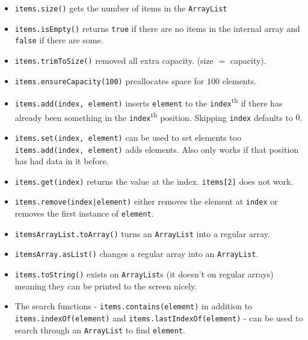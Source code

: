 \begin{itemize}
    \item \texttt{items.size()} gets the number of items in the \texttt{ArrayList}
    \item \texttt{items.isEmpty()} returns \texttt{true} if there are no items in the internal array and \texttt{false} if there are some.
    \item \texttt{items.trimToSize()} removed all extra capacity. (size \(=\) capacity).
    \item \texttt{items.ensureCapacity(100)} preallocates space for \(100\) elements.
    \item \texttt{items.add(index, element)} inserts \texttt{element} to the \texttt{index}\textsuperscript{th} if there has already been something in the \texttt{index}\textsuperscript{th} position. Skipping \texttt{index} defaults to \(0\).
    \item \texttt{items.set(index, element)} can be used to set elements too \texttt{items.add(index, element)} adds elements. Also only works if that position has had data in it before.
    \item \texttt{items.get(index)} returns the value at the index. \texttt{items[2]} does not work.
    \item \texttt{items.remove(index|element)} either removes the element at \texttt{index} or removes the first instance of \texttt{element}.
    \item \texttt{itemsArrayList.toArray()} turns an \texttt{ArrayList} into a regular array.
    \item \texttt{itemsArray.asList()} changes a regular array into an \texttt{ArrayList}.
    \item \texttt{items.toString()} exists on \texttt{ArrayList}s (it doesn't on regular arrays) meaning they can be printed to the screen nicely.
    \item The search functions - \texttt{items.contains(element)} in addition to \texttt{items.indexOf(element)} and \texttt{items.lastIndexOf(element)} - can be used to search through an \texttt{ArrayList} to find \texttt{element}.
\end{itemize}
